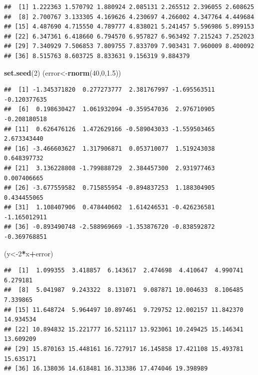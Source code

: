 \documentclass[]{book}
\newenvironment{Shaded}{\begin{snugshade}}{\end{snugshade}}
\newcommand{\KeywordTok}[1]{\textcolor[rgb]{0.13,0.29,0.53}{\textbf{#1}}}
\newcommand{\DecValTok}[1]{\textcolor[rgb]{0.00,0.00,0.81}{#1}}
\newcommand{\FloatTok}[1]{\textcolor[rgb]{0.00,0.00,0.81}{#1}}
\newcommand{\OperatorTok}[1]{\textcolor[rgb]{0.81,0.36,0.00}{\textbf{#1}}}
\newcommand{\NormalTok}[1]{#1}
\theoremstyle{definition}
\theoremstyle{definition}
\theoremstyle{definition}
\theoremstyle{remark}
\begin{document}
\begin{verbatim}
##  [1] 1.222363 1.570792 1.880924 2.085131 2.265512 2.396055 2.608625
##  [8] 2.700767 3.133305 4.169626 4.230697 4.266002 4.347764 4.449684
## [15] 4.487690 4.715550 4.789777 4.838021 5.241457 5.596986 5.899153
## [22] 6.347361 6.418660 6.794570 6.957827 6.963492 7.215243 7.252023
## [29] 7.340929 7.506853 7.809755 7.833709 7.903431 7.960009 8.400092
## [36] 8.515763 8.603725 8.833631 9.156319 9.884379
\end{verbatim}

\begin{Shaded}
\begin{Highlighting}[]
\KeywordTok{set.seed}\NormalTok{(}\DecValTok{2}\NormalTok{)}
\NormalTok{(error<-}\KeywordTok{rnorm}\NormalTok{(}\DecValTok{40}\NormalTok{,}\DecValTok{0}\NormalTok{,}\FloatTok{1.5}\NormalTok{))}
\end{Highlighting}
\end{Shaded}

\begin{verbatim}
##  [1] -1.345371820  0.277273777  2.381767997 -1.695563511 -0.120377635
##  [6]  0.198630427  1.061932094 -0.359547036  2.976710905 -0.208180518
## [11]  0.626476126  1.472629166 -0.589043033 -1.559503465  2.673343440
## [16] -3.466603627  1.317906871  0.053710077  1.519243038  0.648397732
## [21]  3.136228808 -1.799888729  2.384457300  2.931977463  0.007406665
## [26] -3.677559582  0.715855954 -0.894837253  1.188304905  0.434455065
## [31]  1.108407906  0.478440602  1.614246531 -0.426236581 -1.165012911
## [36] -0.893490748 -2.588969669 -1.353876720 -0.838592872 -0.369768851
\end{verbatim}

\begin{Shaded}
\begin{Highlighting}[]
\NormalTok{(y<-}\DecValTok{2}\OperatorTok{*}\NormalTok{x}\OperatorTok{+}\NormalTok{error)}
\end{Highlighting}
\end{Shaded}

\begin{verbatim}
##  [1]  1.099355  3.418857  6.143617  2.474698  4.410647  4.990741  6.279181
##  [8]  5.041987  9.243322  8.131071  9.087871 10.004633  8.106485  7.339865
## [15] 11.648724  5.964497 10.897461  9.729752 12.002157 11.842370 14.934534
## [22] 10.894832 15.221777 16.521117 13.923061 10.249425 15.146341 13.609209
## [29] 15.870163 15.448161 16.727917 16.145858 17.421108 15.493781 15.635171
## [36] 16.138036 14.618481 16.313386 17.474046 19.398989
\end{verbatim}
\end{document}
